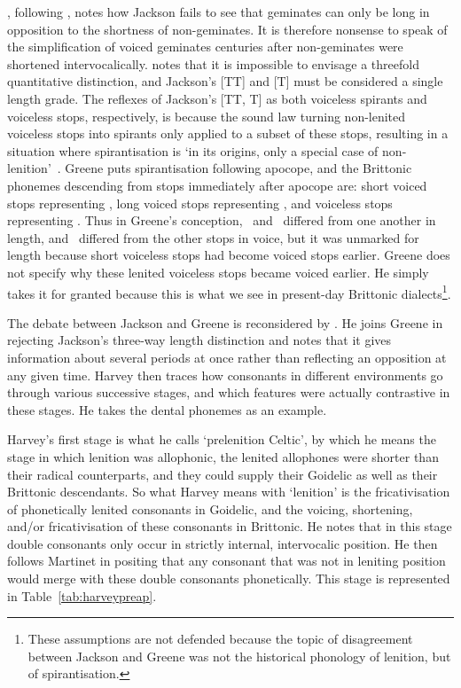 \Textcite{greene_gemination_1956}, following \textcite{martinet_celtic_1952}, notes how Jackson fails to see that geminates can only be long in opposition to the shortness of non-geminates. It is therefore nonsense to speak of the simplification of voiced geminates centuries after non-geminates were shortened intervocalically. \Textcite{Gre_Spirant66} notes that it is impossible to envisage a threefold quantitative distinction, and Jackson's [TT] and [T] must be considered a single length grade. The  reflexes of Jackson's [TT, T] as both voiceless spirants and voiceless stops, respectively, is because the sound law turning non-lenited voiceless stops into spirants  only applied to a subset of these stops, resulting in a situation where spirantisation is `in its origins, only a special case of non-lenition'~\autocite[119]{Gre_Spirant66}. Greene puts spirantisation following apocope, and the Brittonic phonemes descending from stops immediately after apocope are: short voiced stops representing \lT, long voiced stops representing \xD, and voiceless stops representing \xT. Thus in Greene's conception, \lT\ and \xD\ differed from one another in length, and \xT\ differed from the other stops in voice, but it was unmarked for length because short voiceless stops had become voiced stops earlier. Greene does not specify why these lenited voiceless stops became voiced earlier. He simply takes it for granted because this is what we see in present-day Brittonic dialects\footnote{These assumptions are not defended because the topic of disagreement between Jackson and Greene was not the historical phonology of lenition, but of spirantisation.}.


The debate between Jackson and Greene is reconsidered by \textcite{harvey_aspects_1984}. He joins Greene in rejecting Jackson's three-way length distinction and notes that it gives information about several periods at once rather than reflecting an opposition at any given time. Harvey then traces how consonants in different environments go through various successive stages, and which features were actually contrastive in these stages. He takes the dental phonemes as an example.

Harvey's first stage is what he calls `prelenition Celtic', by which he means the stage in which lenition was allophonic, the lenited allophones were shorter than their radical counterparts, and they could supply their Goidelic as well as their Brittonic descendants. So what Harvey means with `lenition' is the fricativisation of phonetically lenited consonants in Goidelic, and the voicing, shortening, and/or fricativisation of these consonants in Brittonic. He notes that in this stage double consonants only occur in strictly internal, intervocalic position. He then follows Martinet in positing that any consonant that was not in leniting position would merge with these double consonants phonetically. This stage is represented in Table~\ref{tab:harveypreap}.


